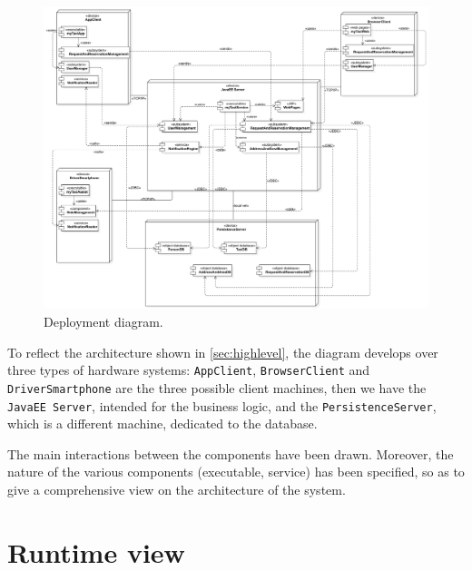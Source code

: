 \begin{figure}%
	\centering%
	\includegraphics[width=\linewidth]{img/Deploy__DeploymentDiagram_4}%
	\caption{Deployment diagram.}\label{fig:deployment}%
\end{figure}

To reflect the architecture shown in \cref{sec:highlevel}, the diagram develops over three types of hardware systems: \texttt{App\-Cli\-ent}, \texttt{Brows\-er\-Cli\-ent} and \texttt{Driver\-Smart\-phone} are the three possible client machines, then we have the \texttt{Java\-EE Ser\-ver}, intended for the business logic, and the \texttt{Per\-sist\-ence\-Ser\-ver}, which is a different machine, dedicated to the database.

The main interactions between the components have been drawn. Moreover, the nature of the various components (executable, service) has been specified, so as to give a comprehensive view on the architecture of the system.













\clearpage%
\section{Runtime view}\label{sec:runtime}


